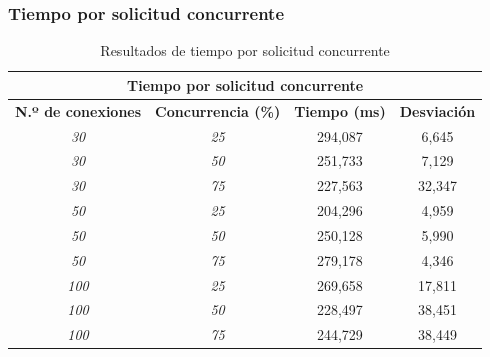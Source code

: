 \subsubsection{Tiempo por solicitud concurrente}
\begin{table}[!ht]
	\begin{center}
		\begin{tabular}{|c|c|c|c|}
			\hline
			\multicolumn{4}{|c|}{{\bf Tiempo por solicitud concurrente}}                               \\ \hline
			{\bf N.º de conexiones} & {\bf Concurrencia (\%)} & {\bf Tiempo (ms)} & {\bf Desviación} \\ \hline
			{\it 30}                & {\it 25}                & 294,087             & 6,645            \\ \hline
			{\it 30}                & {\it 50}                & 251,733             & 7,129            \\ \hline
			{\it 30}                & {\it 75}                & 227,563             & 32,347           \\ \hline
			{\it 50}                & {\it 25}                & 204,296             & 4,959            \\ \hline
			{\it 50}                & {\it 50}                & 250,128             & 5,990            \\ \hline
			{\it 50}                & {\it 75}                & 279,178             & 4,346            \\ \hline
			{\it 100}               & {\it 25}                & 269,658             & 17,811           \\ \hline
			{\it 100}               & {\it 50}                & 228,497             & 38,451           \\ \hline
			{\it 100}               & {\it 75}                & 244,729             & 38,449           \\ \hline
		\end{tabular}
		\caption{Resultados de tiempo por solicitud concurrente}
		\label{table:rtsc}
	\end{center}
\end{table}

